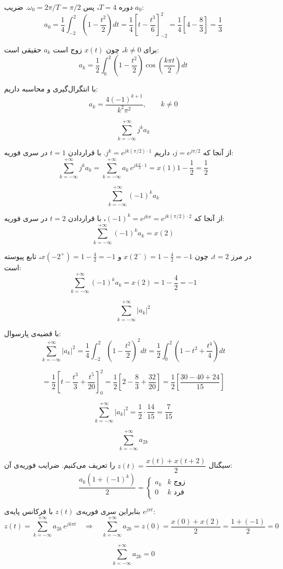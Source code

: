 دوره‌ $T=4$، پس $\omega_0 = 2\pi/T = \pi/2$. ضریب $a_0$:
$$a_0 = \frac{1}{4}\int_{-2}^{2}\!\!\left(1-\frac{t^2}{2}\right)dt
= \frac{1}{4}\left[t-\frac{t^3}{6}\right]_{-2}^{2}
= \frac{1}{4}\left[4-\frac{8}{3}\right] = \frac{1}{3}$$

برای $k\neq 0$، چون $x(t)$ زوج است $a_k$ حقیقی است:
$$a_k = \frac{1}{2}\int_0^2\!\!\left(1-\frac{t^2}{2}\right)\cos\!\left(\frac{k\pi t}{2}\right)dt$$

با انتگرال‌گیری و محاسبه داریم:
$$a_k = \frac{4(-1)^{k+1}}{k^2\pi^2}, \qquad k\neq 0$$


\[
\displaystyle\sum_{k=-\infty}^{+\infty} j^k a_k
\]

از آنجا که $j = e^{j\pi/2}$، داریم $j^k = e^{jk(\pi/2)\cdot 1}$. با قراردادن $t=1$ در سری فوریه:
$$\sum_{k=-\infty}^{+\infty} j^k a_k
= \sum_{k=-\infty}^{+\infty} a_k\,e^{jk\frac{\pi}{2}\cdot 1} = x(1) 1 - \frac{1}{2} = \frac{1}{2}$$


\[
\displaystyle\sum_{k=-\infty}^{+\infty} (-1)^k a_k
\]

از آنجا که $(-1)^k = e^{jk\pi} = e^{jk(\pi/2)\cdot 2}$، با قراردادن $t=2$ در سری فوریه:
$$\sum_{k=-\infty}^{+\infty}(-1)^k a_k = x(2)$$

در مرز $t=2$، چون $x(2^-)=1-\frac{4}{2}=-1$ و $x(-2^+)=1-\frac{4}{2}=-1$، تابع پیوسته است:
$${\sum_{k=-\infty}^{+\infty}(-1)^k a_k = x(2) = 1 - \frac{4}{2} = -1}$$


\[
\displaystyle\sum_{k=-\infty}^{+\infty} |a_k|^2
\]

با قضیه‌ی پارسوال:
$$\sum_{k=-\infty}^{+\infty}|a_k|^2
= \frac{1}{4}\int_{-2}^{2}\!\!\left(1-\frac{t^2}{2}\right)^{\!2}dt
= \frac{1}{2}\int_0^2\!\!\left(1-t^2+\frac{t^4}{4}\right)dt$$

$$= \frac{1}{2}\left[t-\frac{t^3}{3}+\frac{t^5}{20}\right]_0^2
= \frac{1}{2}\left[2-\frac{8}{3}+\frac{32}{20}\right]
= \frac{1}{2}\left[\frac{30-40+24}{15}\right]$$

$${\sum_{k=-\infty}^{+\infty}|a_k|^2 = \frac{1}{2}\cdot\frac{14}{15} = \frac{7}{15}}$$

\[
\displaystyle\sum_{k=-\infty}^{+\infty} a_{2k}
\]

سیگنال $z(t) = \dfrac{x(t)+x(t+2)}{2}$ را تعریف می‌کنیم. ضرایب فوریه‌ی آن:
$$\frac{a_k(1+(-1)^k)}{2}
= \begin{cases}a_k & k \text{ زوج}\\0 & k \text{ فرد}\end{cases}$$

بنابراین سری فوریه‌ی $z(t)$ با فرکانس پایه‌ی $e^{j\pi t}$:
$$z(t) = \sum_{k=-\infty}^{+\infty}a_{2k}\,e^{jk\pi t}
\quad\Longrightarrow\quad
\sum_{k=-\infty}^{+\infty}a_{2k} = z(0) = \frac{x(0)+x(2)}{2} = \frac{1+(-1)}{2} = 0$$

$${\sum_{k=-\infty}^{+\infty}a_{2k} = 0}$$
